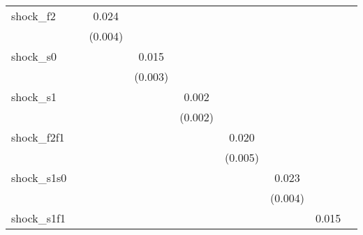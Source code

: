 {\begin{tabular}{l*{8}{c}}
\addlinespace
shock\_f2    &                     &       0.024\sym{***}&                     &                     &                     &                     &                     &                     \\
            &                     &     (0.004)         &                     &                     &                     &                     &                     &                     \\
\addlinespace
shock\_s0    &                     &                     &       0.015\sym{***}&                     &                     &                     &                     &                     \\
            &                     &                     &     (0.003)         &                     &                     &                     &                     &                     \\
\addlinespace
shock\_s1    &                     &                     &                     &       0.002         &                     &                     &                     &                     \\
            &                     &                     &                     &     (0.002)         &                     &                     &                     &                     \\
\addlinespace
shock\_f2f1  &                     &                     &                     &                     &       0.020\sym{***}&                     &                     &                     \\
            &                     &                     &                     &                     &     (0.005)         &                     &                     &                     \\
\addlinespace
shock\_s1s0  &                     &                     &                     &                     &                     &       0.023\sym{***}&                     &                     \\
            &                     &                     &                     &                     &                     &     (0.004)         &                     &                     \\
\addlinespace
shock\_s1f1  &                     &                     &                     &                     &                     &                     &       0.015\sym{**} &                     \\

\end{tabular}}
